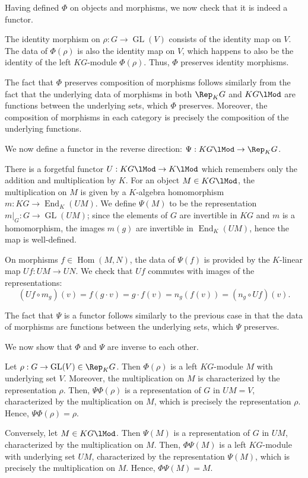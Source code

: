 \documentclass[12pt]{article}
\theoremstyle{definition}
\newcommand{\<}{\langle}
\renewcommand{\>}{\rangle}
\renewcommand{\_}[1]{{_{#1}}}
\DeclareMathOperator{\Hom}{Hom}
\DeclareMathOperator{\GL}{GL}
\begin{document}
Having defined $\Phi$ on objects and morphisms, we now check that it is indeed a functor.

The identity morphism on $\rho : G \to \GL(V)$ consists of the identity map on $V$.
The data of $\Phi(\rho)$ is also the identity map on $V$, which happens to also be the identity of the left $KG$-module $\Phi(\rho)$.
Thus, $\Phi$ preserves identity morphisms.

The fact that $\Phi$ preserves composition of morphisms follows similarly from the fact that the underlying data of morphisms in both $\Rep_KG$ and $KG\lMod$ are functions between the underlying sets, which $\Phi$ preserves.
Moreover, the composition of morphisms in each category is precisely the composition of the underlying functions.


We now define a functor in the reverse direction: $\Psi : KG\lMod \to \Rep_KG$.

There is a forgetful functor $U : KG\lMod \to K\lMod$ which remembers only the addition and multiplication by $K$.
For an object $M \in KG\lMod$, the multiplication on $M$ is given by a $K$-algebra homomorphism $m : KG \to \operatorname{End}_K(UM)$.
We define $\Psi(M)$ to be the representation $m|_G : G \to \GL(UM)$; since the elements of $G$ are invertible in $KG$ and $m$ is a homomorphism, the images $m(g)$ are invertible in $\operatorname{End}_K(UM)$, hence the map is well-defined.

On morphisms $f \in \Hom(M, N)$, the data of $\Psi(f)$ is provided by the $K$-linear map $Uf : UM \to UN$.
We check that $Uf$ commutes with images of the representations:
\[
    (Uf \circ m_g)(v)
        = f(g \cdot v)
        = g \cdot f(v)
        = n_g(f(v))
        = (n_g \circ Uf)(v).
\]

The fact that $\Psi$ is a functor follows similarly to the previous case in that the data of morphisms are functions between the underlying sets, which $\Psi$ preserves.

We now show that $\Phi$ and $\Psi$ are inverse to each other.

Let $\rho : G \to \GL(V) \in \Rep_KG$.
Then $\Phi(\rho)$ is a left $KG$-module $M$ with underlying set $V$. Moreover, the multiplication on $M$ is characterized by the representation $\rho$.
Then, $\Psi\Phi(\rho)$ is a representation of $G$ in $UM = V$, characterized by the multiplication on $M$, which is precisely the representation $\rho$.
Hence, $\Psi\Phi(\rho) = \rho$.

Conversely, let $M \in KG\lMod$.
Then $\Psi(M)$ is a representation of $G$ in $UM$, characterized by the multiplication on $M$.
Then, $\Phi\Psi(M)$ is a left $KG$-module with underlying set $UM$, characterized by the representation $\Psi(M)$, which is precisely the multiplication on $M$.
Hence, $\Phi\Psi(M) = M$.
\end{document}
